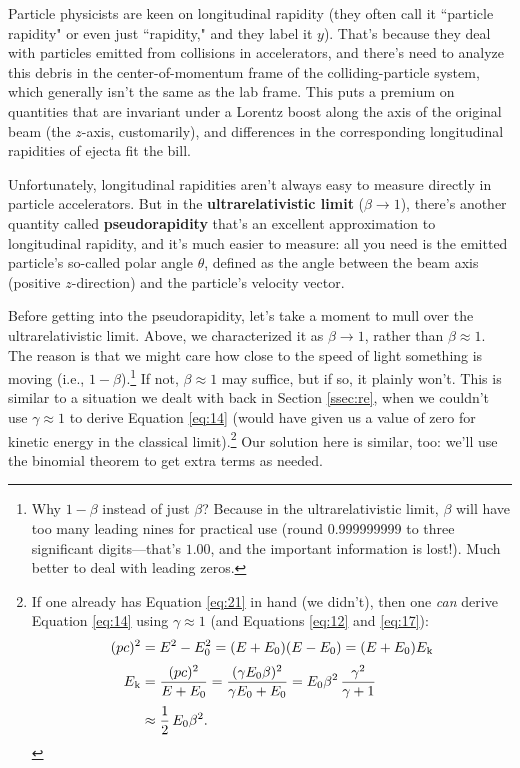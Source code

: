 \documentclass[12pt]{article}
\begin{document}
Particle physicists are keen on longitudinal rapidity (they often call it ``particle rapidity" or even just ``rapidity," and they label it $y$). That's because they deal with particles emitted from collisions in accelerators, and there's need to analyze this debris in the center-of-momentum frame of the colliding-particle system, which generally isn't the same as the lab frame. This puts a premium on quantities that are invariant under a Lorentz boost along the axis of the original beam (the $z$-axis, customarily), and differences in the corresponding longitudinal rapidities of ejecta fit the bill.

Unfortunately, longitudinal rapidities aren't always easy to measure directly in particle accelerators. But in the \textbf{ultrarelativistic limit} ($\beta \rightarrow 1$), there's another quantity called \textbf{pseudorapidity} that's an excellent approximation to longitudinal rapidity, and it's much easier to measure: all you need is the emitted particle's so-called polar angle $\theta$, defined as the angle between the beam axis (positive $z$-direction) and the particle's velocity vector.

Before getting into the pseudorapidity, let's take a moment to mull over the ultrarelativistic limit. Above, we characterized it as $\beta \rightarrow 1$, rather than $\beta \approx 1$. The reason is that we might care how close to the speed of light something is moving (i.e., $1 - \beta$).\footnote{Why $1 - \beta$ instead of just $\beta$? Because in the ultrarelativistic limit, $\beta$ will have too many leading nines for practical use (round 0.999999999 to three significant digits---that's $1.00$, and the important information is lost!). Much better to deal with leading zeros.} If not, $\beta \approx 1$ may suffice, but if so, it plainly won't. This is similar to a situation we dealt with back in Section \ref{ssec:re}, when we couldn't use $\gamma \approx 1$ to derive Equation \ref{eq:14} (would have given us a value of zero for kinetic energy in the classical limit).\footnote{If one already has Equation \ref{eq:21} in hand (we didn't), then one \emph{can} derive Equation \ref{eq:14} using $\gamma \approx 1$ (and Equations \ref{eq:12} and \ref{eq:17}):
\begin{equation*}
\begin{split}
(pc)^2 &= E^2 - E_0^2 = (E + E_0) (E - E_0) = (E + E_0) E_{\mkern.5mu \textrm{k}} \\[2pt]
E_{\mkern.5mu \textrm{k}} &= \dfrac{(pc)^2}{E + E_0} = \dfrac{(\gamma E_0 \beta)^2}{\gamma E_0 + E_0} = E_0 \beta^2 \, \dfrac{\gamma^2}{\gamma + 1} \\[2pt]
&\approx \dfrac{1}{2} \, E_0 \beta^2 .
\end{split}
\end{equation*}
} Our solution here is similar, too: we'll use the binomial theorem to get extra terms as needed.
\end{document}
